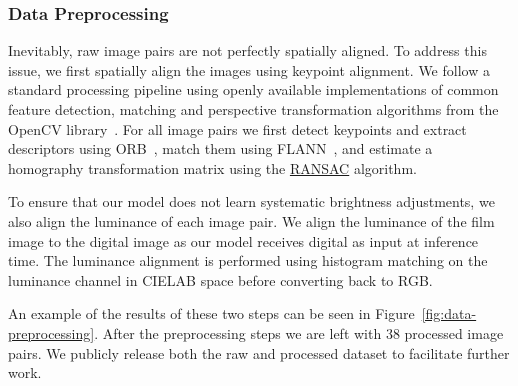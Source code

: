 \subsubsection*{Data Preprocessing}
\label{subsubsec:preprocessing}

Inevitably, raw image pairs are not perfectly spatially aligned. To address this
issue, we first spatially align the images using keypoint alignment. We follow a standard processing pipeline using openly available implementations of common feature detection, matching and perspective transformation algorithms from the OpenCV library~\cite{opencv}. For all image pairs we first detect keypoints and extract descriptors using ORB~\cite{orb}, match them using FLANN~\cite{flann}, and estimate a homography transformation matrix using the \href{https://www.mathworks.com/discovery/ransac.html}{RANSAC} algorithm.

To ensure that our model does not learn systematic brightness adjustments, we also align the luminance of each image pair. We align the luminance of the film image to the digital image as our model receives digital as input at inference time. The luminance alignment is performed using histogram matching on the luminance channel in CIELAB space before converting back to RGB.


An example of the results of these two steps can be seen in Figure~\ref{fig:data-preprocessing}. After the
preprocessing steps we are left with 38 processed image pairs. We publicly
release both the raw and processed dataset to facilitate further work.

